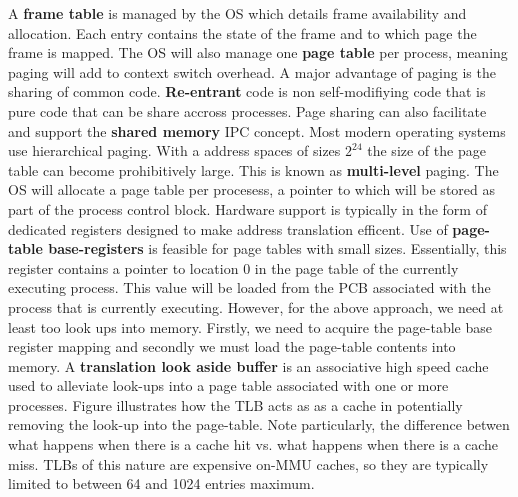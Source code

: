 \documentclass[10pt,a4paper]{article}
\begin{document}
A {\bf frame table} is managed by the OS which details frame availability and allocation. Each entry contains the state of the frame and to which page the frame is mapped. The OS will also manage one {\bf page table} per process, meaning paging will add to context switch overhead. 
\newline\newline 
A major advantage of paging is the sharing of common code. {\bf Re-entrant} code is non self-modifiying code that is pure code that can be share accross processes. Page sharing can also facilitate and support the {\bf shared memory} IPC concept. Most modern operating systems use hierarchical paging. With a address spaces of sizes $2^24$ the size of the page table can become prohibitively large. This is known as {\bf multi-level} paging. 
The OS will allocate a page table per procesess, a pointer to which will be stored as part of the process control block. Hardware support is typically in the form of dedicated registers designed to make address translation efficent. Use of {\bf page-table base-registers} is feasible for page tables with small sizes. Essentially, this register contains a pointer to location 0 in the page table of the currently executing process. This value will be loaded from the PCB associated with the process that is currently executing. 
\newline\newline
However, for the above approach, we need at least too look ups into memory. Firstly, we need to acquire the page-table base register mapping and secondly we must load the page-table contents into memory. A {\bf translation look aside buffer} is an associative high speed cache used to alleviate look-ups into a page table associated with one or more processes. Figure \cite{page-tlb} illustrates how the TLB acts as as a cache in potentially removing the look-up into the page-table. Note particularly, the difference betwen what happens when there is a cache hit vs. what happens when there is a cache miss.
\newline\newline
TLBs of this nature are expensive on-MMU caches, so they are typically limited to between 64 and 1024 entries maximum.
\end{document}
